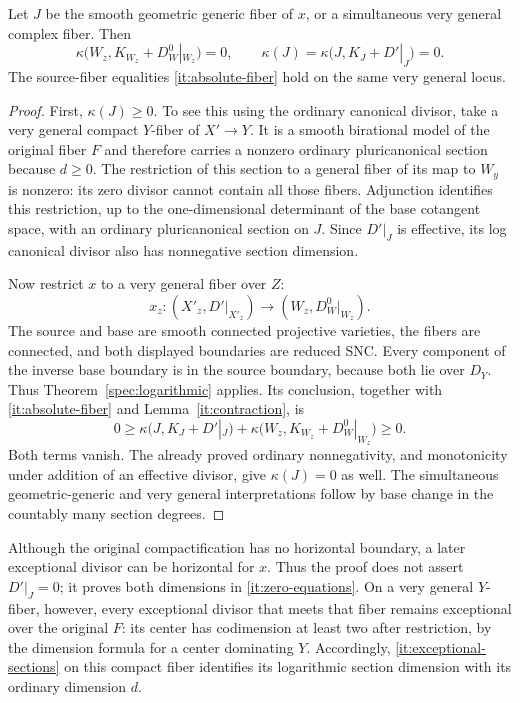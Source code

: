 \begin{lemma}\label{it:zerofiber}
Let $J$ be the smooth geometric generic fiber of $x$, or a simultaneous
very general complex fiber.  Then
\begin{equation}\label{it:zero-equations}
 \kappa\bigl(W_z,K_{W_z}+D_W^0|_{W_z}\bigr)=0,
 \qquad
 \kappa(J)=\kappa\bigl(J,K_J+D'|_J\bigr)=0.
\end{equation}
The source-fiber equalities \eqref{it:absolute-fiber} hold on the same
very general locus.
\end{lemma}

\begin{proof}
First, $\kappa(J)\geq0$.  To see this using the ordinary canonical
divisor, take a very general compact $Y$-fiber of $X'\to Y$.  It is a
smooth birational model of the original fiber $F$ and therefore carries
a nonzero ordinary pluricanonical section because $d\geq0$.  The
restriction of this section to a general fiber of its map to $W_y$ is
nonzero: its zero divisor cannot contain all those fibers.  Adjunction
identifies this restriction, up to the one-dimensional determinant of
the base cotangent space, with an ordinary pluricanonical section on
$J$.  Since $D'|_J$ is effective, its log canonical divisor also has
nonnegative section dimension.

Now restrict $x$ to a very general fiber over $Z$:
\[
 x_z:(X'_z,D'|_{X'_z})\longrightarrow
       (W_z,D_W^0|_{W_z}).
\]
The source and base are smooth connected projective varieties, the
fibers are connected, and both displayed boundaries are reduced SNC.
Every component of the inverse base boundary is in the source boundary,
because both lie over $D_Y$. Thus Theorem~\ref{spec:logarithmic}
applies. Its conclusion, together with
\eqref{it:absolute-fiber} and Lemma~\ref{it:contraction}, is
\[
 0\geq
 \kappa\bigl(J,K_J+D'|_J\bigr)
 +\kappa\bigl(W_z,K_{W_z}+D_W^0|_{W_z}\bigr)\geq0.
\]
Both terms vanish.  The already proved ordinary nonnegativity, and
monotonicity under addition of an effective divisor, give
$\kappa(J)=0$ as well.  The simultaneous geometric-generic and very
general interpretations follow by base change in the countably many
section degrees.
\end{proof}

Although the original compactification has no horizontal boundary, a
later exceptional divisor can be horizontal for $x$.  Thus the proof
does not assert $D'|_J=0$; it proves both dimensions in
\eqref{it:zero-equations}.  On a very general $Y$-fiber, however, every
exceptional divisor that meets that fiber remains exceptional over the
original $F$: its center has codimension at least two after restriction,
by the dimension formula for a center dominating $Y$.  Accordingly,
\eqref{it:exceptional-sections} on this compact fiber identifies its
logarithmic section dimension with its ordinary dimension $d$.

